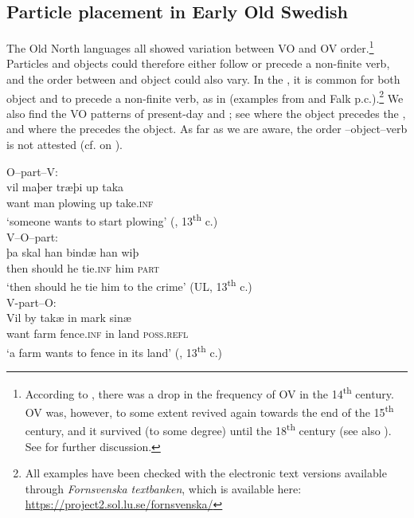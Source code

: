 \documentclass[output=paper]{langscibook}
\begin{document}
\subsection{Particle placement in Early Old Swedish}\label{sec:lalu:4.1}

The Old North  languages all showed variation between VO and OV order.\footnote{According to \citet{Delsing1999}, there was a drop in the frequency of OV in the 14\textsuperscript{th} century. OV was, however, to some extent revived again towards the end of the 15\textsuperscript{th} century, and it survived (to some degree) until the 18\textsuperscript{th} century (see also \citealt{Petzell2011}). See  for further discussion.} Particles and objects could therefore either follow or precede a non-finite verb, and the order between  and object could also vary. In the  , it is common for both object and  to precede a non-finite verb, as in  (examples from \citealt{Ljunggren1932} and Falk p.c.).\footnote{All  examples have been checked with the electronic text versions available through \textit{Fornsvenska textbanken}, which is available here: \url{https://project2.sol.lu.se/fornsvenska/}}  We also find the VO patterns of present-day  and ; see  where the object precedes the , and  where the  precedes the object. As far as we are aware, the order –object–verb is not attested (cf. \citealt{Hroarsdottir2008} on ).


\ea\label{ex:lalu:21}
\ea\label{ex:lalu:21a} O–part–V:  \\
\gll  vil     maþer   træþi       up   taka \\
    want     man     plowing    up   take\textsc{.inf} \\
\glt `someone wants to start plowing’ (, 13\textsuperscript{th} c.)\\

\ex\label{ex:lalu:21b} V–O–part:     \\
\gll  þa     skal     han   bindæ   han   wiþ \\
    then   should   he   tie\textsc{.inf}   him   \textsc{part} \\
\glt `then should he tie him to the crime’ (UL, 13\textsuperscript{th} c.)\\

\ex\label{ex:lalu:21c}  V-part–O:     \\
\gll  Vil     by   takæ       in   mark   sinæ \\
    want  farm   fence.\textsc{inf}   in   land   \textsc{poss.refl} \\
\glt `a farm wants to fence in its land’ (, 13\textsuperscript{th} c.)\\
\z
\z
\end{document}
